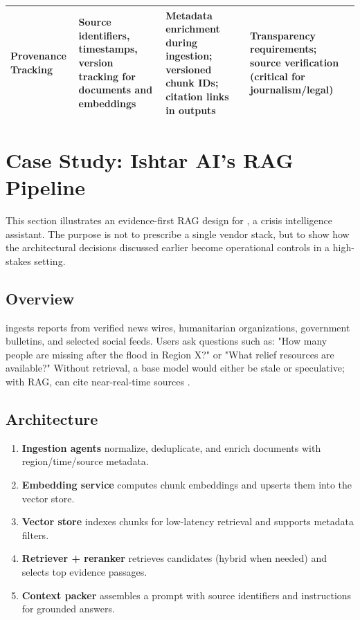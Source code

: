 \begin{table}[tb]
\begin{tabularx}{\linewidth}{@{}>{\raggedright\arraybackslash}p{3cm}>{\raggedright\arraybackslash}X>{\raggedright\arraybackslash}X>{\raggedright\arraybackslash}X@{}}
\addlinespace[1pt]
\textbf{Provenance Tracking} & Source identifiers, timestamps, version tracking for documents and embeddings & Metadata enrichment during ingestion; versioned chunk IDs; citation links in outputs & Transparency requirements; source verification (critical for journalism/legal) \\
\bottomrule
\end{tabularx}
\end{table}

\FloatBarrier
\section{Case Study: Ishtar AI's RAG Pipeline}
\label{sec:rag-case-study-ishtar-ai-s-rag-pipeline}
This section illustrates an evidence-first RAG design for \ishtar{}, a crisis intelligence assistant. The purpose is not to prescribe a single vendor stack, but to show how the architectural decisions discussed earlier become operational controls in a high-stakes setting.

\subsection{Overview}
\ishtar{} ingests reports from verified news wires, humanitarian organizations, government bulletins, and selected social feeds. Users ask questions such as: "How many people are missing after the flood in Region X?" or "What relief resources are available?" Without retrieval, a base model would either be stale or speculative; with RAG, \ishtar{} can cite near-real-time sources \cite{Lewis2020RAG,Nakano2021WebGPT}.

\subsection{Architecture}
\begin{enumerate}
    \item \textbf{Ingestion agents} normalize, deduplicate, and enrich documents with region/time/source metadata.
    \item \textbf{Embedding service} computes chunk embeddings and upserts them into the vector store.
    \item \textbf{Vector store} indexes chunks for low-latency retrieval and supports metadata filters.
    \item \textbf{Retriever + reranker} retrieves candidates (hybrid when needed) and selects top evidence passages.
    \item \textbf{Context packer} assembles a prompt with source identifiers and instructions for grounded answers.
\end{enumerate}

